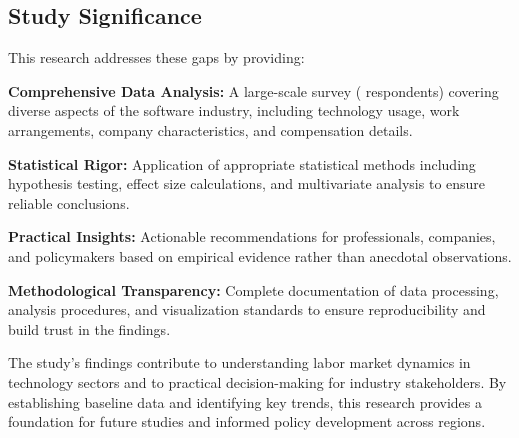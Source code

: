 \subsection*{Study Significance}

This research addresses these gaps by providing:

\textbf{Comprehensive Data Analysis:} A large-scale survey (\SampleSize{} respondents) covering diverse aspects of the software industry, including technology usage, work arrangements, company characteristics, and compensation details.

\textbf{Statistical Rigor:} Application of appropriate statistical methods including hypothesis testing, effect size calculations, and multivariate analysis to ensure reliable conclusions.

\textbf{Practical Insights:} Actionable recommendations for professionals, companies, and policymakers based on empirical evidence rather than anecdotal observations.

\textbf{Methodological Transparency:} Complete documentation of data processing, analysis procedures, and visualization standards to ensure reproducibility and build trust in the findings.

The study's findings contribute to understanding labor market dynamics in technology sectors and to practical decision-making for industry stakeholders. By establishing baseline data and identifying key trends, this research provides a foundation for future studies and informed policy development across regions.

